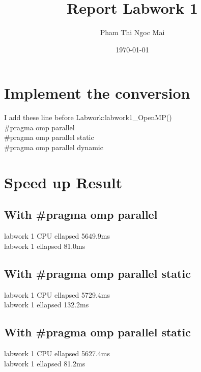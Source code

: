 \documentclass{article}
\title{Report Labwork 1}
\author{Pham Thi Ngoc Mai}
\date{\today}
\begin{document}
\maketitle

\section{Implement the conversion}
I add these line before Labwork:labwork1\_OpenMP() \\
\#pragma omp parallel \\
\#pragma omp parallel static \\
\#pragma omp parallel dynamic


\section{Speed up Result}
\subsection{With \#pragma omp parallel}
labwork 1 CPU ellapsed 5649.9ms \\
labwork 1 ellapsed 81.0ms
\subsection{With \#pragma omp parallel static}
labwork 1 CPU ellapsed 5729.4ms \\
labwork 1 ellapsed 132.2ms
\subsection{With \#pragma omp parallel static}
labwork 1 CPU ellapsed 5627.4ms \\
labwork 1 ellapsed 81.2ms
\end{document}
